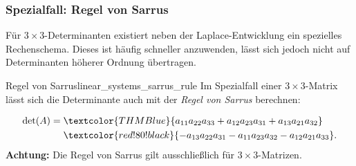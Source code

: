 \begin{minipage}{\linewidth}
\subsubsection{Spezialfall: Regel von Sarrus}
\label{subsubsec:linear_systems_sarrus_rule}

Für $3\times3$-Determinanten existiert neben der Laplace-Entwicklung ein
spezielles Rechenschema. Dieses ist häufig schneller anzuwenden, lässt sich
jedoch nicht auf Determinanten höherer Ordnung übertragen.

\begin{KeyPointBox}{Regel von Sarrus}{linear_systems_sarrus_rule}
  Im Spezialfall einer $3\times3$-Matrix lässt sich die Determinante auch mit
  der \emph{Regel von Sarrus}  berechnen:

  \begin{center}
  \end{center}
  \vspace{-0.3\baselineskip}
  \begin{align*}
    \det(A)
    ={}&\textcolor{THMBlue}{a_{11}a_{22}a_{33}
       +a_{12}a_{23}a_{31}
       +a_{13}a_{21}a_{32}}\\
     &\textcolor{red!80!black}{-a_{13}a_{22}a_{31}
       -a_{11}a_{23}a_{32}
       -a_{12}a_{21}a_{33}}.
  \end{align*}
  \textbf{Achtung:} Die Regel von Sarrus gilt ausschließlich für
  $3\times3$-Matrizen.
\end{KeyPointBox}
\end{minipage}

